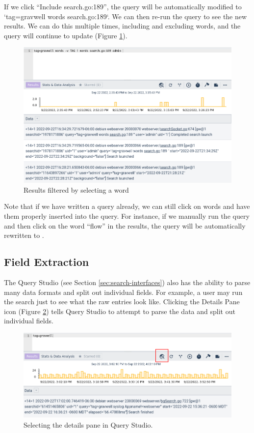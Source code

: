 If we click ``Include search.go:189'', the query will be automatically modified to `tag=gravwell words search.go:189`. We can then re-run the query to see the new results. We can do this multiple times, including and excluding words, and the query will continue to update (Figure \ref{fig:words-filtered}).

\begin{figure}
	\includegraphics[width=0.8\linewidth]{images/words-filtered.png}
	\caption{Results filtered by selecting a word}
	\label{fig:words-filtered}
\end{figure}

Note that if we have written a query already, we can still click on words and have them properly inserted into the query. For instance, if we manually run the query  and then click on the word ``flow'' in the results, the query will be automatically rewritten to .

\subsection{Field Extraction}

The Query Studio (see Section \ref{sec:search-interfaces}) also has the ability to parse many data formats and split out individual fields. For example, a user may run the search  just to see what the raw entries look like. Clicking the Details Pane icon (Figure \ref{fig:details-icon}) tells Query Studio to attempt to parse the data and split out individual fields.

\begin{figure}
	\includegraphics[width=0.8\linewidth]{images/details-icon.png}
	\caption{Selecting the details pane in Query Studio.}
	\label{fig:details-icon}
\end{figure}


